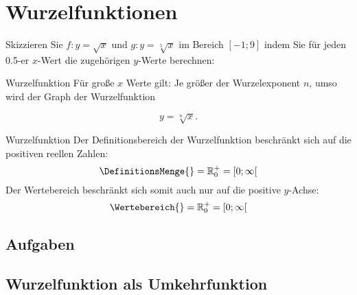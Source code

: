 \section{Wurzelfunktionen}




Skizzieren Sie $f: y = \sqrt{x}$ und $g: y=\sqrt[5]{x}$ im Bereich $[-1; 9]$ indem Sie für jeden 0.5-er $x$-Wert die zugehörigen $y$-Werte berechnen:


\begin{bemerkung}{Wurzelfunktion}{}
Für große $x$ Werte gilt: Je größer der Wurzelexponent $n$, umso
 wird der Graph der Wurzelfunktion

$$y=\sqrt[n]{x}.$$ 

\end{bemerkung}


\begin{definition}{Wurzelfunktion}{}
  Der Definitionsbereich der Wurzelfunktion beschränkt sich auf die
  positiven reellen Zahlen:
  $$\DefinitionsMenge{} = \mathbb{R}_0^{+} = [0;\infty[$$
      Der Wertebereich beschränkt sich somit auch nur auf die positive $y$-Achse:
  $$\Wertebereich{} = \mathbb{R}_0^{+} = [0;\infty[$$
      
\end{definition}
\newpage

\subsection*{Aufgaben}



\newpage

\subsection{Wurzelfunktion als
  Umkehrfunktion}

